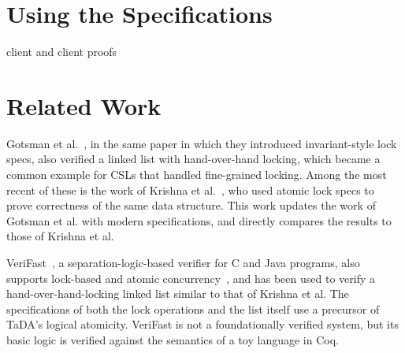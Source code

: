 \documentclass[runningheads]{llncs}
\newcommand{\treerep}{\ensuremath{\mathsf{bst\_abs}}}
\newcommand{\nodeboxrep}{\ensuremath{\mathsf{bst\_ref}}}
\newcommand{\ignore}[1]{}
\begin{document}
\ignore{\section{Lock-Free BST}
We want to prove that a lock-free BST implementation satisfies the same specification as our hand-over-hand implementation. Unfortunately, provably-correct deletion in a lock-free setting is a research topic in itself (cite?), so we begin with a lock-free BST that only supports insert and lookup. Once again, we want to prove
\begin{mathpar}
\forall t.\ \langle \nodeboxrep\ p\ |\ \treerep\ t\rangle\ \texttt{insert}(p, k, v)\ \langle \nodeboxrep\ p\ |\ \treerep\ (\mathrm{insert}\ t\ k\ v)\rangle

\forall t.\ \langle \nodeboxrep\ p\ |\ \treerep\ t\rangle\ \texttt{lookup}(p, k)\ \langle v.\ \nodeboxrep\ p\ |\ \treerep\ t \land \mathrm{lookup}\ t\ k = v\rangle
\end{mathpar}
though the precise definitions of $\nodeboxrep$ and $\treerep$ will differ. %
}

\section{Using the Specifications}
client and client proofs

\section{Related Work}
\label{related}
Gotsman et al.~\cite{gotsman}, in the same paper in which they introduced invariant-style lock specs, also verified a linked list with hand-over-hand locking, which became a common example for CSLs that handled fine-grained locking. Among the most recent of these is the work of Krishna et al.~\cite{templates}, who used atomic lock specs to prove correctness of the same data structure. This work updates the work of Gotsman et al. with modern specifications, and directly compares the results to those of Krishna et al.

VeriFast~\cite{verifast}, a separation-logic-based verifier for C and Java programs, also supports lock-based and atomic concurrency~\cite{verifast-conc}, and has been used to verify a hand-over-hand-locking linked list similar to that of Krishna et al. The specifications of both the lock operations and the list itself use a precursor of TaDA's logical atomicity. VeriFast is not a foundationally verified system, but its basic logic is verified against the semantics of a toy language in Coq. 
\end{document}
